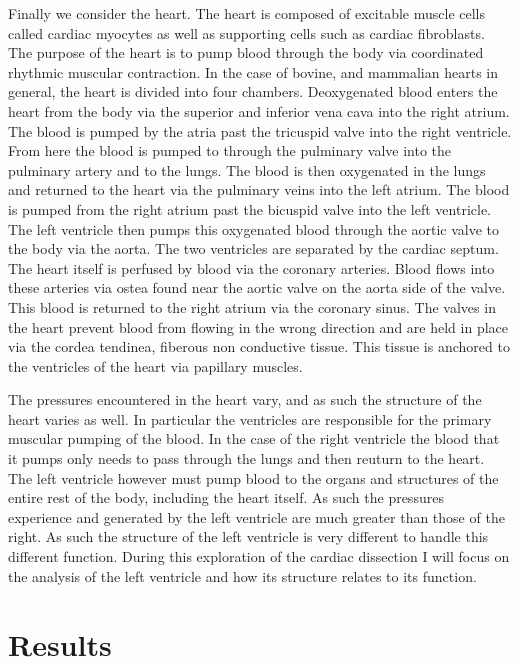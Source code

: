 \documentclass[12pt]{article}
\begin{document}
\par{}
Finally we consider the heart. The heart is composed of excitable muscle cells called cardiac myocytes as well as supporting cells such as cardiac fibroblasts. The purpose of the heart is to pump blood through the body via coordinated rhythmic muscular contraction. In the case of bovine, and mammalian hearts in general, the heart is divided into four chambers. Deoxygenated blood enters the heart from the body via the superior and inferior vena cava into the right atrium. The blood is pumped by the atria past the tricuspid valve into the right ventricle. From here the blood is pumped to through the pulminary valve into the pulminary artery and to the lungs. The blood is then oxygenated in the lungs and returned to the heart via the pulminary veins into the left atrium. The blood is pumped from the right atrium past the bicuspid valve into the left ventricle. The left ventricle then pumps this oxygenated blood through the aortic valve to the body via the aorta. The two ventricles are separated by the cardiac septum. The heart itself is perfused by blood via the coronary arteries. Blood flows into these arteries via ostea found near the aortic valve on the aorta side of the valve. This blood is returned to the right atrium via the coronary sinus. The valves in the heart prevent blood from flowing in the wrong direction and are held in place via the cordea tendinea, fiberous non conductive tissue. This tissue is anchored to the ventricles of the heart via papillary muscles. 
\par{}
The pressures encountered in the heart vary, and as such the structure of the heart varies as well. In particular the ventricles are responsible for the primary muscular pumping of the blood. In the case of the right ventricle the blood that it pumps only needs to pass through the lungs and then reuturn to the heart. The left ventricle however must pump blood to the organs and structures of the entire rest of the body, including the heart itself. As such the pressures experience and generated by the left ventricle are much greater than those of the right. As such the structure of the left ventricle is very different to handle this different function. During this exploration of the cardiac dissection I will focus on the analysis of the left ventricle and how its structure relates to its function.


\section{Results}
\end{document}

